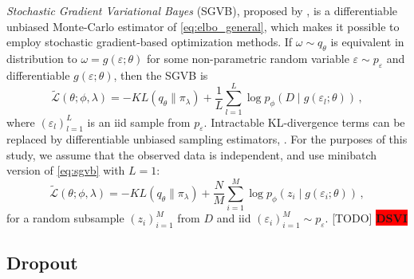 \documentclass[a4paper,10pt]{article}
\newcommand{\important}[1]{\textbf{\!\colorbox{red}{#1}\!}}
\newcommand{\todo}[1]{{\color{blue} [TODO]} \important{#1}}
\begin{document}
\textit{Stochastic Gradient Variational Bayes} (SGVB), proposed by \citep{kingma_auto-encoding_2014},
is a differentiable unbiased Monte-Carlo estimator of \eqref{eq:elbo_general}, which makes
it possible to employ stochastic gradient-based optimization methods. If $
  \omega \sim q_{\theta}
$ is equivalent in distribution to $
  \omega = g(\varepsilon; \theta)
$ for some non-parametric random variable $
    \varepsilon \sim p_\varepsilon
$ and differentiable $
  g(\varepsilon; \theta)
$, then the SGVB is
\begin{equation}  \label{eq:sgvb}
  \widetilde{\mathcal{L}}(\theta; \phi, \lambda)
    = - KL(q_{\theta} \| \pi_{\lambda})
      + \frac1{L} \sum_{l=1}^L
        \log p_{\phi}(D \mid g(\varepsilon_{l}; \theta))
    \,, 
\end{equation}
where $
  (\varepsilon_{l})_{l=1}^L
$ is an iid sample from $p_\varepsilon$. Intractable KL-divergence terms can be replaced
by differentiable unbiased sampling estimators, \citep{kingma_auto-encoding_2014}.
%
For the purposes of this study, we assume that the observed data is independent, and
use minibatch version of \eqref{eq:sgvb} with $L=1$:
\begin{equation}  \label{eq:elbo}
  \widetilde{\mathcal{L}}(\theta; \phi, \lambda)
    = - KL(q_{\theta} \| \pi_{\lambda})
      + \frac{N}{M} \sum_{i=1}^M
        \log p_{\phi}(z_i \mid g(\varepsilon_i; \theta))
    \,,
\end{equation}
for a random subsample $(z_i)_{i=1}^M$ from $D$ and iid $
  (\varepsilon_i)_{i=1}^M \sim p_\varepsilon
$.
%
\todo{DSVI}
\citep{titsias_doubly_2014}

\subsection{Dropout} %
\label{sub:dropout}
\end{document}
